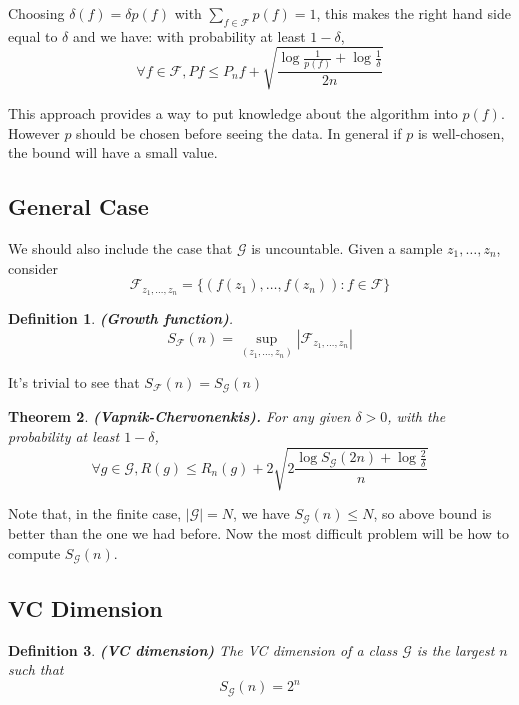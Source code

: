 \documentclass[12pt,reqno]{amsart}
\newtheorem{thm}{Theorem}[section]
\newtheorem{definition}[thm]{Definition}
{ \theoremstyle{remark}\newtheorem*{remark}{Remark} }
\begin{document}
Choosing $\delta (f) = \delta p(f)$ with $\sum_{f\in\mathcal{F}}p(f) = 1$, this makes the right hand side equal to $\delta$ and we have: with probability at least $1-\delta$,
\begin{equation}
	\forall f\in \mathcal{F}, Pf\leq P_nf + \sqrt{\frac{\log \frac{1}{p(f)} + \log \frac{1}{\delta}}{2n}}
\end{equation}

This approach provides a way to put knowledge about the algorithm into $p(f)$. However $p$ should be chosen before seeing the data. In general if $p$ is well-chosen, the bound will have a small value. 

\subsection{General Case}
We should also include the case that $\mathcal{G}$ is uncountable.
Given a sample $z_1,\ldots, z_n$, consider
$$
	\mathcal{F}_{z_1,\ldots,z_n} = \{ (f(z_1),\ldots,f(z_n)): f\in \mathcal{F}\}
$$

\begin{definition}\textbf{(Growth function)}. 
\begin{equation}
	S_{\mathcal{F}}(n) = \sup_{(z_1,\ldots,z_n)}|\mathcal{F}_{z_1,\ldots,z_n} |
\end{equation}

\end{definition}
It's trivial to see that $S_{\mathcal{F}}(n) = S_{\mathcal{G}}(n)$

\begin{thm}\textbf{(Vapnik-Chervonenkis).} 
	\label{v-c}
For any given $\delta > 0$, with the probability at least $1-\delta$,
$$
	\forall g\in\mathcal{G}, R(g) \leq R_n(g)+ 2\sqrt{2\frac{\log S_{\mathcal{G}}(2n) + \log \frac{2}{\delta}}{n}}
$$
\end{thm}
Note that, in the finite case, $|\mathcal{G}|=N$, we have $S_{\mathcal{G}}(n)\leq N$, so above bound is better than the one we had before. Now the most difficult problem will be how to compute $S_{\mathcal{G}}(n)$.


\subsection{VC Dimension}
\begin{definition} \textbf{(VC dimension)}
The VC dimension of a class $\mathcal{G}$ is the largest $n$ such that
$$
	S_{\mathcal{G}}(n) = 2^n
$$
\end{definition}
\end{document}
